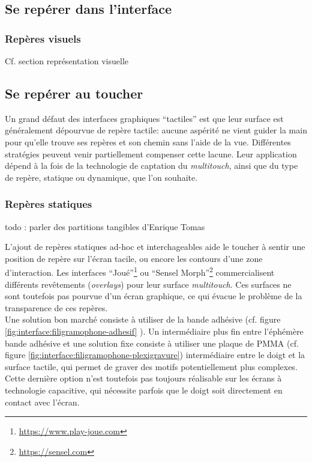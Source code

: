 \subsection{Se repérer dans l'interface}

\subsubsection{Repères visuels}
Cf. section représentation visuelle

\subsection{Se repérer au toucher}
\indent Un grand défaut des interfaces graphiques ``tactiles'' est que leur surface est généralement dépourvue de repère tactile: aucune aspérité ne vient guider la main pour qu'elle trouve ses repères et son chemin sans l'aide de la vue. Différentes stratégies peuvent venir partiellement compenser cette lacune. Leur application dépend à la fois de la technologie de captation du \textit{multitouch}, ainsi que du type de repère, statique ou dynamique, que l'on souhaite.

\subsubsection{Repères statiques}
todo : parler des partitions tangibles d'Enrique Tomas

\noindent L'ajout de repères statiques ad-hoc et interchageables aide le toucher à sentir une position de repère sur l'écran tacile, ou encore les contours d'une zone d'interaction. Les interfaces ``Joué''\footnote{\url{https://www.play-joue.com}} ou ``Sensel Morph''\footnote{\url{https://sensel.com}} commercialisent différents revêtements (\textit{overlays}) pour leur surface \textit{multitouch}. Ces surfaces ne sont toutefois pas pourvue d'un écran graphique, ce qui évacue le problème de la transparence de ces repères.\\
Une solution bon marché consiste à utiliser de la bande adhésive (cf. figure \ref{fig:interface:filigramophone-adhesif}
). Un intermédiaire plus fin entre l'éphémère bande adhésive et une solution fixe consiste à utiliser une plaque de \gls{PMMA} (cf. figure \ref{fig:interface:filigramophone-plexigravure}) intermédiaire entre le doigt et la surface tactile, qui permet de graver des motifs potentiellement plus complexes. Cette dernière option n'est toutefois pas toujours réalisable sur les écrans à technologie capacitive, qui nécessite parfois que le doigt soit directement en contact avec l'écran.\\

